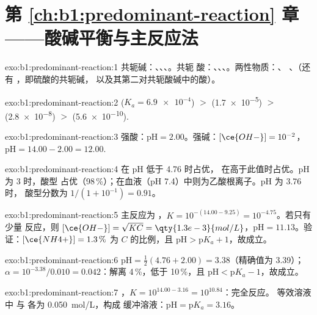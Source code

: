 \section*{第 \ref{ch:b1:predominant-reaction} 章——酸碱平衡与主反应法}

\begin{solution}{exo:b1:predominant-reaction:1}
共轭碱：、、、。共轭
酸：、、、。两性物质：、
、（还有 ，即硫酸的共轭碱，
以及其第二对共轭酸碱中的酸）。
\end{solution}

\begin{solution}{exo:b1:predominant-reaction:2}
 ($K_a = \num{6.9e-4}$) $>$  (\num{1.7e-5}) $>$ 
(\num{2.8e-8}) $>$  (\num{5.6e-10}).
\end{solution}

\begin{solution}{exo:b1:predominant-reaction:3}
强酸：$\mathrm{pH} = 2.00$。强碱：$[\ce{OH-}] = 10^{-2}$，
$\mathrm{pH} = 14.00 - 2.00 = 12.00$.
\end{solution}

\begin{solution}{exo:b1:predominant-reaction:4}
 在 pH 低于 4.76 时占优， 在高于此值时占优。pH 为 3 时，酸型
占优（98\,\%）；在血液（pH 7.4）中则为乙酸根离子。pH 为 3.76 时，
酸型分数为 $1/(1 + 10^{-1}) = 0.91$。
\end{solution}

\begin{solution}{exo:b1:predominant-reaction:5}
主反应为 ，$K = 10^{-(14.00 -
9.25)} = 10^{-4.75}$。若只有少量  反应，则 $[\ce{OH-}] = \sqrt{K C} =
\qty{1.3e-3}{mol/L}$，$\mathrm{pH} = 11.13$。验证：$[\ce{NH4+}] = 1.3\,\%$
为 $C$ 的比例，且 $\mathrm{pH} > \mathrm{p}K_a + 1$，故成立。
\end{solution}

\begin{solution}{exo:b1:predominant-reaction:6}
$\mathrm{pH} = \frac12(4.76 + 2.00) = 3.38$（精确值为 3.39）；
$\alpha = 10^{-3.38}/0.010 = 0.042$：解离 4\,\%，低于 10\,\%，且
$\mathrm{pH} < \mathrm{p}K_a - 1$，故成立。
\end{solution}

\begin{solution}{exo:b1:predominant-reaction:7}
，$K = 10^{14.00 - 3.16} = 10^{10.84}$：完全反应。
等效溶液中  与  各为 \qty{0.050}{mol/L}，构成
缓冲溶液：$\mathrm{pH} = \mathrm{p}K_a = 3.16$。
\end{solution}

